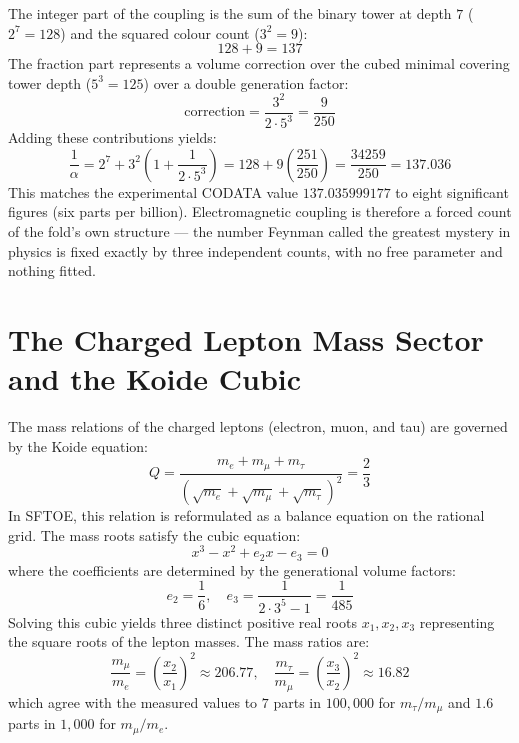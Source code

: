 \documentclass[11pt,a4paper]{article}
\begin{document}
The integer part of the coupling is the sum of the binary tower at depth $7$ ($2^7 = 128$) and the squared colour count ($3^2 = 9$):
\begin{equation}
128 + 9 = 137
\end{equation}
The fraction part represents a volume correction over the cubed minimal covering tower depth ($5^3 = 125$) over a double generation factor:
\begin{equation}
\text{correction} = \frac{3^2}{2 \cdot 5^3} = \frac{9}{250}
\end{equation}
Adding these contributions yields:
\begin{equation}
\frac{1}{\alpha} = 2^7 + 3^2 \left( 1 + \frac{1}{2 \cdot 5^3} \right) = 128 + 9 \left( \frac{251}{250} \right) = \frac{34259}{250} = 137.036
\end{equation}
This matches the experimental CODATA value $137.035999177$ to eight significant figures (six parts per billion). Electromagnetic coupling is therefore a forced count of the fold's own structure --- the number Feynman called the greatest mystery in physics is fixed exactly by three independent counts, with no free parameter and nothing fitted.

\section{The Charged Lepton Mass Sector and the Koide Cubic}
The mass relations of the charged leptons (electron, muon, and tau) are governed by the Koide equation:
\begin{equation}
Q = \frac{m_e + m_\mu + m_\tau}{(\sqrt{m_e} + \sqrt{m_\mu} + \sqrt{m_\tau})^2} = \frac{2}{3}
\end{equation}
In SFTOE, this relation is reformulated as a balance equation on the rational grid. The mass roots satisfy the cubic equation:
\begin{equation}
x^3 - x^2 + e_2 x - e_3 = 0
\end{equation}
where the coefficients are determined by the generational volume factors:
\begin{equation}
e_2 = \frac{1}{6}, \quad e_3 = \frac{1}{2 \cdot 3^5 - 1} = \frac{1}{485}
\end{equation}
Solving this cubic yields three distinct positive real roots $x_1, x_2, x_3$ representing the square roots of the lepton masses. The mass ratios are:
\begin{equation}
\frac{m_\mu}{m_e} = \left(\frac{x_2}{x_1}\right)^2 \approx 206.77, \quad \frac{m_\tau}{m_\mu} = \left(\frac{x_3}{x_2}\right)^2 \approx 16.82
\end{equation}
which agree with the measured values to $7$ parts in $100{,}000$ for $m_\tau/m_\mu$ and $1.6$ parts in $1{,}000$ for $m_\mu/m_e$.
\end{document}
